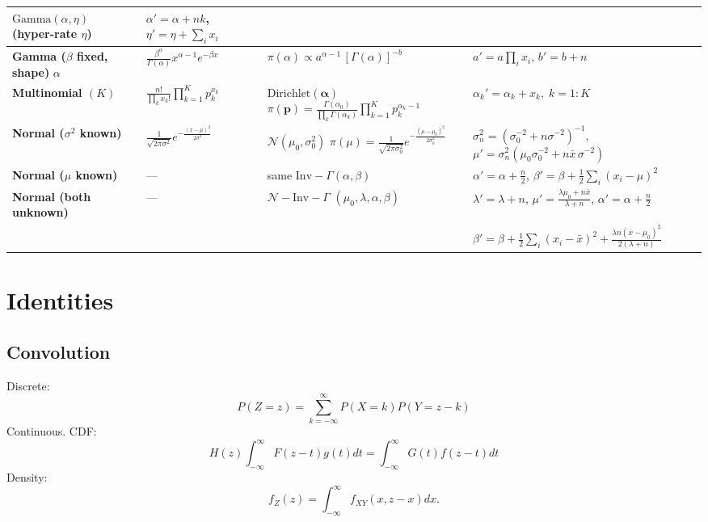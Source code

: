 \documentclass{article}
\begin{document}
\begin{table}[htbp]
\begin{adjustbox}{max width=\textwidth}
\begin{tabular}{@{}p{3.0cm} p{3.2cm} p{4.3cm} p{4.1cm}@{}}
\makecell[l]{$\mathrm{Gamma}(\alpha,\eta)$\\[-2pt]
(hyper-rate $\eta$)} &
$\alpha'=\alpha+n k$,\;
$\eta'=\eta+\sum_i x_i$ \\
\midrule
\textbf{Gamma ($\beta$ fixed, shape)} $\alpha$ &
$\displaystyle\frac{\beta^{\alpha}}{\Gamma(\alpha)}
x^{\alpha-1}e^{-\beta x}$ &
$\displaystyle\pi(\alpha)\propto
a^{\alpha-1}\,[\Gamma(\alpha)]^{-b}$ &
$a'=a\prod_i x_i$,\;
$b'=b+n$ \\
\midrule
\textbf{Multinomial $(K)$} &
$\displaystyle
\frac{n!}{\prod_k x_k!}\prod_{k=1}^K p_k^{x_k}$ &
\makecell[l]{$\mathrm{Dirichlet}(\boldsymbol\alpha)$\\[-2pt]
$\displaystyle
\pi(\mathbf p)=
\frac{\Gamma(\alpha_0)}{\prod_k\Gamma(\alpha_k)}
\prod_{k=1}^K p_k^{\alpha_k-1}$} &
$\alpha_k'=\alpha_k+x_k,\;k=1{:}K$ \\
\midrule
\textbf{Normal ($\sigma^2$ known)} &
$\displaystyle
\frac{1}{\sqrt{2\pi\sigma^{2}}}
e^{-\frac{(x-\mu)^2}{2\sigma^{2}}}$ &
\makecell[l]{$\mathcal N(\mu_0,\sigma_0^{2})$\\[-2pt]
$\displaystyle
\pi(\mu)=\frac{1}{\sqrt{2\pi\sigma_0^{2}}}
e^{-\frac{(\mu-\mu_0)^2}{2\sigma_0^{2}}}$} &
$\displaystyle\sigma_n^{2}=
(\sigma_0^{-2}+n\sigma^{-2})^{-1}$,\;
$\displaystyle\mu'=\sigma_n^{2}
(\mu_0\sigma_0^{-2}+n\bar x\,\sigma^{-2})$ \\
\midrule
\textbf{Normal ($\mu$ known)} &
— & same $\mathrm{Inv}\!\!-\!\Gamma(\alpha,\beta)$ &
$\alpha'=\alpha+\tfrac n2$,\;
$\displaystyle\beta'=\beta+\tfrac12\sum_i(x_i-\mu)^2$ \\
\midrule
\textbf{Normal (both unknown)} &
— &
\makecell[l]{$\mathcal N\!\!-\!\mathrm{Inv}\!\!-\!\Gamma$\\[-2pt]
$(\mu_0,\lambda,\alpha,\beta)$} &
$\lambda'=\lambda+n$,\;
$\displaystyle\mu'=\frac{\lambda\mu_0+n\bar x}{\lambda+n}$,\;
$\alpha'=\alpha+\tfrac n2$\\[-4pt]
& & &
$\displaystyle\beta'=\beta+\tfrac12\sum_i(x_i-\bar x)^2
+\frac{\lambda n(\bar x-\mu_0)^2}{2(\lambda+n)}$ \\
\bottomrule
\end{tabular}
\end{adjustbox}
\end{table}


\section{Identities}

\subsection{Convolution}
Discrete:
$$P(Z=z) = \sum_{k=-\infty}^\infty P(X= k) P(Y= z-k)$$
Continuous. CDF:
$$H(z) \int_{-\infty}^\infty F(z-t) g(t) dt = \int_{-\infty}^\infty G(t) f(z-t) dt$$
Density:
$$f_Z(z) = \int_{-\infty}^\infty f_{XY} (x,z-x)dx.$$
\end{document}
